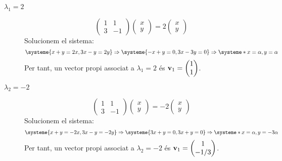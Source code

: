 \begin{description}
  \item[$\boxed{\lambda_1=2}$] 
  \[
    \begin{pmatrix}1&1\\3&-1\end{pmatrix}
    \begin{pmatrix}x\\y\end{pmatrix}=2\begin{pmatrix}x\\y\end{pmatrix}\]  Solucionem el sistema:
  \[
    \systeme{x+y=2x,3x-y=2y} \Rightarrow
    \systeme{-x+y=0,3x-3y=0}  \Rightarrow
    \systeme*{x=\alpha,y=\alpha}\]
  Per tant, un vector propi associat a $\lambda_1=2$ és $\textbf{v}_1=\begin{pmatrix}1\\1\end{pmatrix}$. 
  \item[$\boxed{\lambda_2=-2}$] 
  \[
    \begin{pmatrix}1&1\\3&-1\end{pmatrix}
    \begin{pmatrix}x\\y\end{pmatrix}=-2\begin{pmatrix}x\\y\end{pmatrix}\]  Solucionem el sistema:
  \[
    \systeme{x+y=-2x,3x-y=-2y} \Rightarrow
    \systeme{3x+y=0,3x+y=0}  \Rightarrow
    \systeme*{x=\alpha,y=-3\alpha}\]
  Per tant, un vector propi associat a $\lambda_2=-2$ és $\textbf{v}_1=\begin{pmatrix}1\\-1/3\end{pmatrix}$. 
\end{description}


\blacksquare
